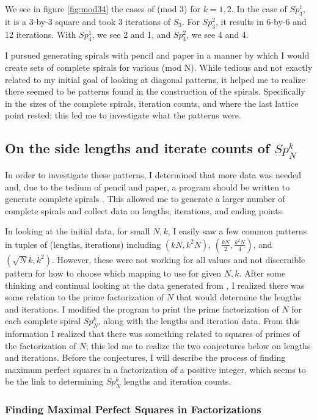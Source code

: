 \documentclass[11pt]{amsart}
\theoremstyle{mydef}
\begin{document}
We see in figure \ref{fig:mod34} the cases of (mod 3) for $k=1,2$.  In the case of $Sp^1_3$, it is a 3-by-3 square and took 3 iterations of $S_3$. For $Sp^2_3$, it results in 6-by-6 and 12 iterations. With $Sp^1_4$, we see 2 and 1, and $Sp^2_4$, we see 4 and 4.

I pursued generating spirals with pencil and paper in a manner by which I would create sets of complete spirals for various (mod N). While tedious and not exactly related to my initial goal of looking at diagonal patterns, it helped me to realize there seemed to be patterns found in the construction of the spirals. Specifically in the sizes of the complete spirals, iteration counts, and where the last lattice point rested; this led me to investigate what the patterns were.

\subsection{On the side lengths and iterate counts of $Sp^k_N$}
In order to investigate these patterns, I determined that more data was needed and, due to the tedium of pencil and paper, a program should be written to generate complete spirals \cite{PySquare}. This allowed me to generate a larger number of complete spirals and collect data on lengths, iterations, and ending points. 

In looking at the initial data, for small $N, k$, I easily saw a few common patterns in tuples of (lengths, iterations) including $(kN, k^2N)$, $(\frac{kN}{2}, \frac{k^2N}{4})$, and $(\sqrt{N}k, k^2)$. However, these were not working for all values and not discernible pattern for how to choose which mapping to use for given $N, k$. After some thinking and continual looking at the data generated from \cite{PySquare}, I realized there was some relation to the prime factorization of $N$ that would determine the lengths and iterations. I modified the program to print the prime factorization of $N$ for each complete spiral $Sp^k_N$, along with the lengths and iteration data. From this information I realized that there was something related to squares of primes of the factorization of $N$; this led me to realize the two conjectures below on lengths and iterations. Before the conjectures, I will describe the process of finding maximum perfect squares in a factorization of a positive integer, which seems to be the link to determining $Sp^k_N$ lengths and iteration counts.


\subsubsection{Finding Maximal Perfect Squares in Factorizations}
\end{document}
